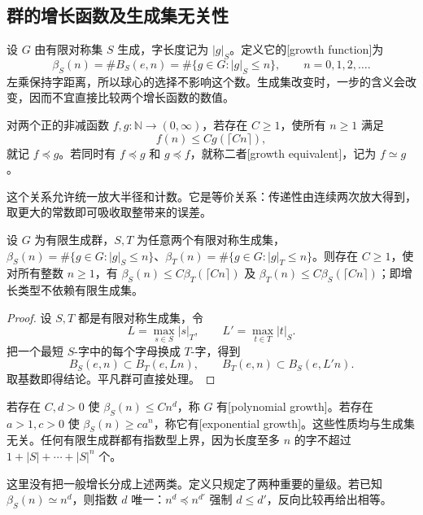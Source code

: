 \subsection{群的增长函数及生成集无关性}
\label{g3:subsec:D02:01}

设 \(G\) 由有限对称集 \(S\) 生成，字长度记为 \(|g|_S\)。定义它的[growth function]为
\[
	\beta_S(n)=\#B_S(e,n)=\#\{g\in G:|g|_S\le n\},\qquad n=0,1,2,\ldots.
\]
左乘保持字距离，所以球心的选择不影响这个数。生成集改变时，一步的含义会改变，因而不宜直接比较两个增长函数的数值。

\begin{definition}\label{g3:def:D-growth-equivalence}
	对两个正的非减函数 \(f,g:\mathbb N\rightarrow(0,\infty)\)，若存在 \(C\ge1\)，使所有 \(n\ge1\) 满足
	\[
		f(n)\le Cg(\lceil Cn\rceil),
	\]
	就记 \(f\preceq g\)。若同时有 \(f\preceq g\) 和 \(g\preceq f\)，就称二者[growth equivalent]，记为 \(f\simeq g\)。
\end{definition}

这个关系允许统一放大半径和计数。它是等价关系：传递性由连续两次放大得到，取更大的常数即可吸收取整带来的误差。

\begin{proposition}\label{g3:prop:D-growth-generators}
	设 \(G\) 为有限生成群，\(S,T\) 为任意两个有限对称生成集，\(\beta_S(n)=\#\{g\in G:|g|_S\le n\}\)、\(\beta_T(n)=\#\{g\in G:|g|_T\le n\}\)。则存在 \(C\ge1\)，使对所有整数 \(n\ge1\)，有 \(\beta_S(n)\le C\beta_T(\lceil Cn\rceil)\) 及 \(\beta_T(n)\le C\beta_S(\lceil Cn\rceil)\)；即增长类型不依赖有限生成集。
\end{proposition}
\begin{proof}
	设 \(S,T\) 都是有限对称生成集，令
	\[
		L=\max_{s\in S}|s|_T,\qquad L'=\max_{t\in T}|t|_S.
	\]
	把一个最短 \(S\)-字中的每个字母换成 \(T\)-字，得到
	\[
		B_S(e,n)\subset B_T(e,Ln),\qquad
		B_T(e,n)\subset B_S(e,L'n).
	\]
	取基数即得结论。平凡群可直接处理。
\end{proof}

若存在 \(C,d>0\) 使 \(\beta_S(n)\le Cn^d\)，称 \(G\) 有[polynomial growth]。若存在 \(a>1,c>0\) 使 \(\beta_S(n)\ge ca^n\)，称它有[exponential growth]。这些性质均与生成集无关。任何有限生成群都有指数型上界，因为长度至多 \(n\) 的字不超过 \(1+|S|+\cdots+|S|^n\) 个。

\ProseParagraphBreak

这里没有把一般增长分成上述两类。定义只规定了两种重要的量级。若已知 \(\beta_S(n)\simeq n^d\)，则指数 \(d\) 唯一：\(n^d\preceq n^{d'}\) 强制 \(d\le d'\)，反向比较再给出相等。

